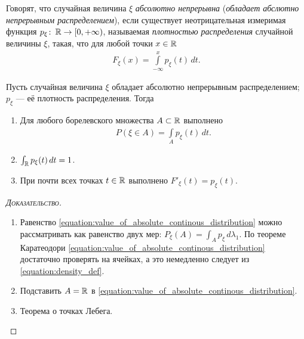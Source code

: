 \documentclass[../main.tex]{subfiles}
\begin{document}
\begin{df}
 Говорят, что  случайная величина $\xi$ \textit{абсолютно непрерывна} (\textit{обладает абслютно непрерывным распределением}), если существует неотрицательная измеримая функция $p_{\xi} \colon\, \mathbb{R} \to [0, +\infty)$, называемая \textit{плотностью распределения} случайной величины $ \xi $,  такая, что для любой точки $ x \in \mathbb{R} $
 \begin{align}
  \label{equation:density_def}
  F_{\xi}(x) = \int\limits_{-\infty}^{x} p_{\xi}(t)\,dt
 .\end{align}
\end{df}
\begin{prop}
 Пусть случайная величина $ \xi $ обладает абсолютно непрерывным распределением; $ p_{\xi} $ --- её плотность распределения. Тогда
 \begin{enumerate}
  \item Для любого борелевского множества $ A \subset \mathbb{R} $ выполнено
   \begin{align}
    \label{equation:value_of_absolute_continous_distribution}
    P(\xi \in A) = \int\limits_{A} p_{\xi} (t) \, dt.
   \end{align} 
  \item $ \int_{\mathbb{R}} p_{\xi}(t)\,dt = 1   $.
  \item При почти всех точках $ t \in \mathbb{R} $ выполнено $ F'_{\xi}(t) = p_{\xi}(t) $.
 \end{enumerate}
\end{prop}
\begin{proof}[\normalfont\textsc{Доказательство}]\
 \begin{enumerate}
  \item Равенство \eqref{equation:value_of_absolute_continous_distribution} можно рассматривать как равенство двух мер: $ P_\xi(A) = \int_{A} p_\xi \, d\lambda_1  $. По теореме Каратеодори \eqref{equation:value_of_absolute_continous_distribution} достаточно проверять на ячейках, а это немедленно следует из \eqref{equation:density_def}.
  \item Подставить $ A = \mathbb{R} $ в \eqref{equation:value_of_absolute_continous_distribution}.
  \item Теорема о точках Лебега.
 \end{enumerate}
\end{proof}
\end{document}
